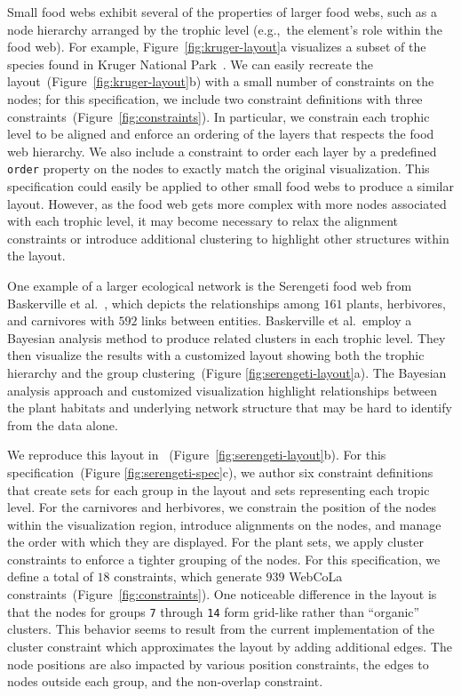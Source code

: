 Small food webs exhibit several of the properties of larger food webs, such
as a node hierarchy arranged by the trophic level (e.g.,~the element's 
role within the food web).
For example, Figure~\ref{fig:kruger-layout}a visualizes a subset of the
species found in Kruger National Park~\cite{kruger2017}. We can easily 
recreate the layout~(Figure~\ref{fig:kruger-layout}b) with a small 
number of constraints on the nodes; for this specification, we include 
two constraint definitions with three constraints~(Figure~\ref{fig:constraints}).
In particular, we constrain each trophic level to be aligned and enforce an
ordering of the layers that respects the food web hierarchy. We also
include a constraint to order each layer by a predefined \texttt{order} property
on the nodes to exactly match the original visualization. This \projectname specification 
could easily be applied to other small food webs to produce a similar layout.
However, as the food web gets more complex with more nodes associated with
each trophic level, it may become necessary to relax the alignment
constraints or introduce additional clustering to highlight other
structures within the layout.

One example of a larger ecological network is the Serengeti food web from
Baskerville et al.~\cite{baskerville2011spatial,baskerville2011interactive}, which depicts the
relationships among $161$ plants, herbivores, and carnivores with $592$ links
between entities. Baskerville et al.\ employ a Bayesian analysis method to
produce related clusters in each trophic level. They then visualize the results with a
customized layout showing both the trophic hierarchy and
the group clustering~(Figure \ref{fig:serengeti-layout}a). The Bayesian
analysis approach and customized visualization highlight relationships between
the plant habitats and underlying network structure that may be hard to identify
from the data alone.

We reproduce this layout in \projectname~(Figure~\ref{fig:serengeti-layout}b).
For this specification~(Figure \ref{fig:serengeti-spec}c), we author six constraint 
definitions that create sets for each group in the layout and sets 
representing each tropic level. For the carnivores and herbivores,
we constrain the position of the nodes within the visualization region,
introduce alignments on the nodes, and manage the order with which they
are displayed. For the plant sets, we apply cluster constraints
to enforce a tighter grouping of the nodes. For this specification,
we define a total of $18$ \projectname constraints, which generate $939$
WebCoLa constraints~(Figure~\ref{fig:constraints}). One noticeable difference
in the \projectname layout is that the nodes for groups \texttt{7} through
\texttt{14} form grid-like rather than ``organic'' clusters. This behavior
seems to result from the current implementation of the cluster constraint
which approximates the layout by adding additional edges. The node
positions are also impacted by various position constraints, the edges to 
nodes outside each group, and the non-overlap constraint.

